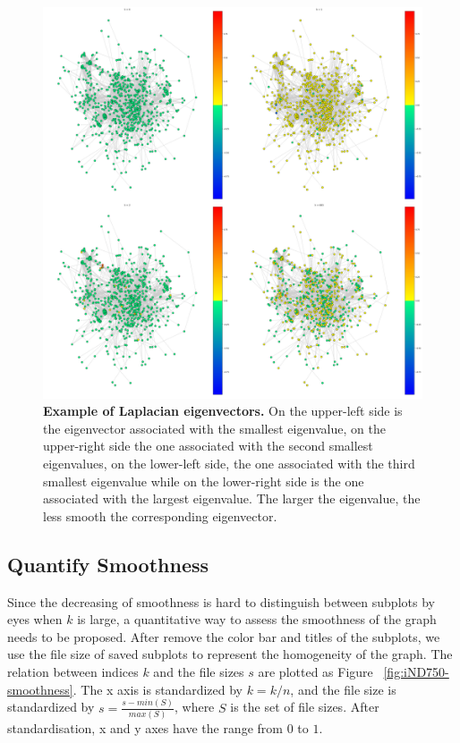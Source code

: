 \documentclass{article} %
\begin{document}
\begin{figure}[H]
      \graphicspath{ {images/} }
      \begin{center}
            \includegraphics[scale=0.2]{iND750-4.png}
      \end{center}
      \caption{\textbf{Example of Laplacian eigenvectors.} On the upper-left side is the eigenvector associated with the smallest eigenvalue, on the upper-right side the one associated with the second smallest eigenvalues, on the lower-left side, the one associated with the third smallest eigenvalue while on the lower-right side is the one associated with the largest eigenvalue. The larger the eigenvalue, the less smooth the corresponding eigenvector.}
      \label{fig:iND750-4}
\end{figure}

\subsection{Quantify Smoothness} \label{section:quantify-smoothness}
Since the decreasing of smoothness is hard to distinguish between subplots by eyes when $k$ is large, a quantitative way to assess the smoothness of the graph needs to be proposed. After remove the color bar and titles of the subplots, we use the file size of saved subplots to represent the homogeneity of the graph. The relation between indices $k$ and the file sizes $s$ are plotted as Figure ~\ref{fig:iND750-smoothness}. The x axis is standardized by $ k = k / n$, and the file size is standardized by $s = \frac{s - min(S)}{max(S)}$, where $S$ is the set of file sizes. After standardisation, x and y axes have the range from $0$ to $1$.
\end{document}
